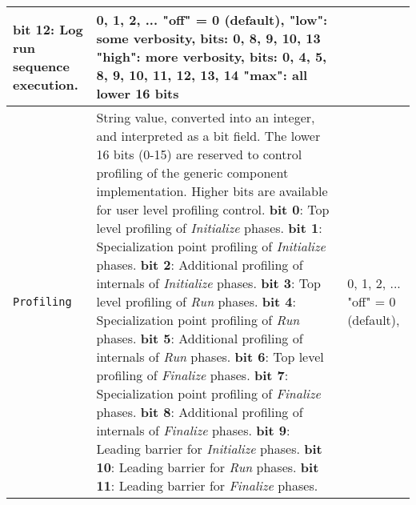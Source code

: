 \begin{longtable}{|p{}|p{}|p{}|}
                       {\bf bit 12}: Log run sequence execution.
                     & 0, 1, 2, ... \newline
                       "off" = 0 (default), \newline
                       "low": some verbosity, bits: 0, 8, 9, 10, 13\newline
                       "high": more verbosity, bits: 0, 4, 5, 8, 9, 10, 11, 12, 13, 14\newline
                       "max": all lower 16 bits\\ \hline
     {\tt Profiling} & String value, converted into an integer, and interpreted as a bit field. The lower 16 bits (0-15) are reserved to control profiling of the generic component implementation. Higher bits are available for user level profiling control. \newline
                       {\bf bit 0}: Top level profiling of {\em Initialize} phases.\newline
                       {\bf bit 1}: Specialization point profiling of {\em Initialize} phases.\newline
                       {\bf bit 2}: Additional profiling of internals of {\em Initialize} phases.\newline
                       {\bf bit 3}: Top level profiling of {\em Run} phases.\newline
                       {\bf bit 4}: Specialization point profiling of {\em Run} phases.\newline
                       {\bf bit 5}: Additional profiling of internals of {\em Run} phases.\newline
                       {\bf bit 6}: Top level profiling of {\em Finalize} phases.\newline
                       {\bf bit 7}: Specialization point profiling of {\em Finalize} phases.\newline
                       {\bf bit 8}: Additional profiling of internals of {\em Finalize} phases.\newline
                       {\bf bit 9}: Leading barrier for {\em Initialize} phases.\newline
                       {\bf bit 10}: Leading barrier for {\em Run} phases.\newline
                       {\bf bit 11}: Leading barrier for {\em Finalize} phases.\newline
                     & 0, 1, 2, ... \newline
                       "off" = 0 (default), \newline

\end{longtable}
